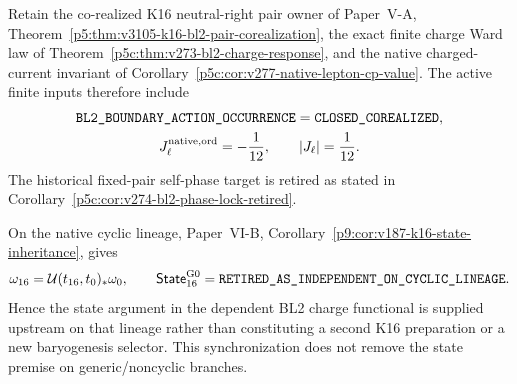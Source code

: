 \documentclass[12pt,a4paper]{article}
\begin{document}
\begin{corollary}
\label{p5c:cor:v280-native-baryogenesis-frontier}
Retain the co-realized K16 neutral-right pair owner of
Paper~V-A, Theorem~\ref{p5:thm:v3105-k16-bl2-pair-corealization}, the exact
finite charge Ward law of Theorem~\ref{p5c:thm:v273-bl2-charge-response}, and
the native charged-current invariant of
Corollary~\ref{p5c:cor:v277-native-lepton-cp-value}.  The active finite inputs
therefore include
\[
\begin{gathered}
 \texttt{BL2\_BOUNDARY\_ACTION\_OCCURRENCE}
 =\texttt{CLOSED\_COREALIZED},\\
 J_\ell^{\rm native,ord}=-\frac1{12},\qquad |J_\ell|=\frac1{12}.
\end{gathered}
\]
The historical fixed-pair self-phase target is retired as stated in
Corollary~\ref{p5c:cor:v274-bl2-phase-lock-retired}.

On the native cyclic lineage, Paper~VI-B,
Corollary~\ref{p9:cor:v187-k16-state-inheritance}, gives
\[
 \omega_{16}=\mathcal U(t_{16},t_0)_*\omega_0,
 \qquad
 \mathsf{State}^{\rm G0}_{16}
 =\texttt{RETIRED\_AS\_INDEPENDENT\_ON\_CYCLIC\_LINEAGE}.
\]
Hence the state argument in the dependent BL2 charge functional is supplied
upstream on that lineage rather than constituting a second K16 preparation or
a new baryogenesis selector.  This synchronization does not remove the state
premise on generic/noncyclic branches.


\end{corollary}
\end{document}
